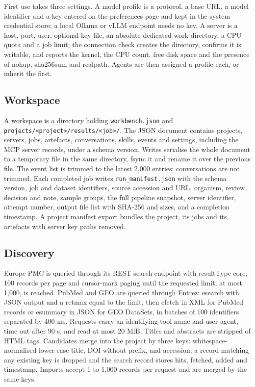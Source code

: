 \documentclass[11pt,a4paper]{article}
\begin{document}
First use takes three settings. A model profile is a protocol, a base
URL, a model identifier and a key entered on the preferences page and
kept in the system credential store; a local Ollama or vLLM endpoint
needs no key. A server is a host, port, user, optional key file, an
absolute dedicated work directory, a CPU quota and a job limit; the
connection check creates the directory, confirms it is writable, and
reports the kernel, the CPU count, free disk space and the presence of
nohup, sha256sum and realpath. Agents are then assigned a profile each,
or inherit the first.

\subsection{Workspace}\label{workspace}

A workspace is a directory holding \texttt{workbench.json} and
\texttt{projects/\textless{}project\textgreater{}/results/\textless{}job\textgreater{}/}.
The JSON document contains projects, servers, jobs, artefacts, conversations, skills, events and
settings, including the MCP server records, under a schema version. Writes
serialise the whole document to a temporary file in the same directory,
fsync it and rename it over the previous file. The event list is trimmed
to the latest 2,000 entries; conversations are not trimmed. Each
completed job writes \texttt{run\_manifest.json} with the schema
version, job and dataset identifiers, source accession and URL,
organism, review decision and note, sample groups, the full pipeline
snapshot, server identifier, attempt number, output file list with
SHA-256 and sizes, and a completion timestamp. A project manifest export
bundles the project, its jobs and its artefacts with server key paths
removed.

\subsection{Discovery}\label{discovery}

Europe PMC is queried through its REST search endpoint with resultType
core, 100 records per page and cursor-mark paging until the requested
limit, at most 1,000, is reached. PubMed and GEO are queried through
Entrez: esearch with JSON output and a retmax equal to the limit, then
efetch in XML for PubMed records or esummary in JSON for GEO DataSets,
in batches of 100 identifiers separated by 400 ms. Requests carry an
identifying tool name and user agent, time out after 90 s, and read at
most 20 MiB. Titles and abstracts are stripped of HTML tags. Candidates
merge into the project by three keys: whitespace-normalised lower-case
title, DOI without prefix, and accession; a record matching any existing
key is dropped and the search record stores hits, fetched, added and
timestamp. Imports accept 1 to 1,000 records per request and are merged
by the same keys.
\end{document}
